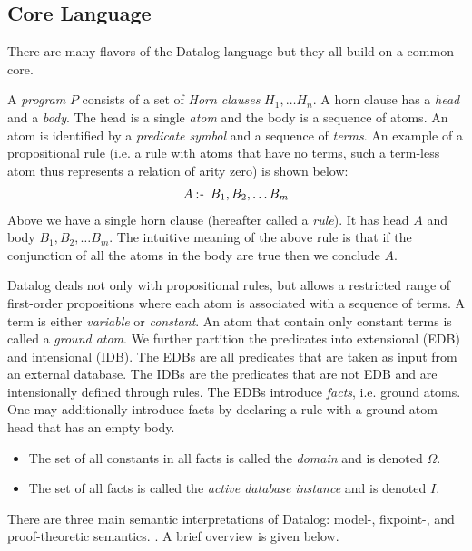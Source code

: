 \subsection{Core Language}
There are many flavors of the Datalog language but they all build on a common core. 

A \textit{program} $P$ consists of a set of \textit{Horn clauses} $H_1, \ldots H_n$. A horn clause has a \textit{head} and a \textit{body}. The head is a single \textit{atom} and the body is a sequence of atoms. An atom is identified by a \textit{predicate symbol} and a sequence of \textit{terms}. An example of a propositional rule (i.e. a rule with atoms that have no terms, such a term-less atom thus represents a relation of arity zero) is shown below:
\begin{align*}
A \mathbin{:\hspace{-0.5ex}\textsf{-}} \;B_1, B_2, \ldots B_m
\end{align*}
\noindent
Above we have a single horn clause (hereafter called a \textit{rule}). It has head $A$ and body $B_1, B_2, \ldots B_m$. The intuitive meaning of the above rule is that if the conjunction of all the atoms in the body are true then we conclude $A$.

Datalog deals not only with propositional rules, but allows a restricted range of first-order propositions where each atom is associated with a sequence of terms. A term is either \textit{variable} or \textit{constant}. An atom that contain only constant terms is called a \textit{ground atom}. We further partition the predicates into extensional (EDB) and intensional (IDB). The EDBs are all predicates that are taken as input from an external database. The IDBs are the predicates that are not EDB and are intensionally defined through rules. The EDBs introduce \textit{facts}, i.e. ground atoms. One may additionally introduce facts by declaring a rule with a ground atom head that has an empty body. 

\begin{itemize}
\item The set of all constants in all facts is called the \textit{domain} and is denoted $\Omega$.
\item The set of all facts is called the \textit{active database instance} and is denoted $I$.
\end{itemize}
 
There are three main semantic interpretations of Datalog: model-, fixpoint-, and proof-theoretic semantics. \cite{Green:2013:DRQ:2688167.2688168}. A brief overview is given below.

